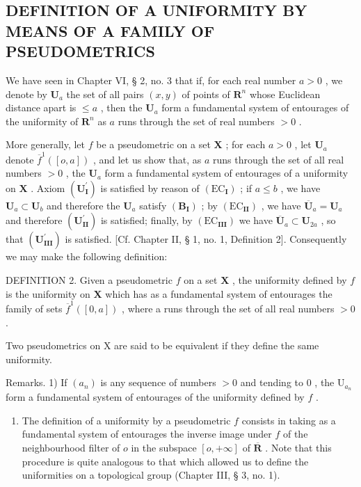 \subsection{DEFINITION OF A UNIFORMITY BY MEANS OF A FAMILY OF PSEUDOMETRICS}

We have seen in Chapter VI, § 2, no. 3 that if, for each real number \(a > 0\) , we denote by \(\mathbf{U}_a\) the set of all pairs \((x, y)\) of points of \(\mathbf{R}^n\) whose Euclidean distance apart is \(\leqslant a\) , then the \(\mathbf{U}_a\) form a fundamental system of entourages of the uniformity of \(\mathbf{R}^n\) as \(a\) runs through the set of real numbers \(> 0\) .

More generally, let \(f\) be a pseudometric on a set \(\mathbf{X}\) ; for each \(a > 0\) , let \(\mathbf{U}_a\) denote \(\overline{f}^{1}([o, a])\) , and let us show that, as \(a\) runs through the set of all real numbers \(> 0\) , the \(\mathbf{U}_a\) form a fundamental system of entourages of a uniformity on \(\mathbf{X}\) . Axiom \((\mathbf{U}_{\mathbf{I}}^{\prime})\) is satisfied by reason of \((\mathrm{EC}_{\mathbf{I}})\) ; if \(a \leqslant b\) , we have \(\mathbf{U}_a \subset \mathbf{U}_b\) and therefore the \(\mathbf{U}_a\) satisfy \((\mathbf{B}_{\mathbf{I}})\) ; by \((\mathrm{EC}_{\mathbf{II}})\) , we have \(\overline{\mathbf{U}}_a = \mathbf{U}_a\) and therefore \((\mathbf{U}_{\mathbf{II}}^{\prime})\) is satisfied; finally, by \((\mathrm{EC}_{\mathbf{III}})\) we have \(\overline{\mathbf{U}}_a \subset \mathbf{U}_{2a}\) , so that \((\mathbf{U}_{\mathbf{III}}^{\prime})\) is satisfied. {[}Cf. Chapter II, § 1, no. 1, Definition 2{]}. Consequently we may make the following definition:

DEFINITION 2. Given a pseudometric \(f\) on a set \(\mathbf{X}\) , the uniformity defined by \(f\) is the uniformity on \(\mathbf{X}\) which has as a fundamental system of entourages the family of sets \(\overline{f}^{1}([0, a])\) , where a runs through the set of all real numbers \(> 0\) .

Two pseudometrics on X are said to be equivalent if they define the same uniformity.

Remarks. 1) If \((a_{n})\) is any sequence of numbers \(>0\) and tending to \(0\) , the \(\mathrm{U}_{a_n}\) form a fundamental system of entourages of the uniformity defined by \(f\) .

\begin{enumerate}
\def\labelenumi{\arabic{enumi})}
\setcounter{enumi}{1}
\tightlist
\item
  The definition of a uniformity by a pseudometric \(f\) consists in taking as a fundamental system of entourages the inverse image under \(f\) of the neighbourhood filter of \(o\) in the subspace \([o, +\infty]\) of \(\overline{\mathbf{R}}\) . Note that this procedure is quite analogous to that which allowed us to define the uniformities on a topological group (Chapter III, § 3, no. 1).
\end{enumerate}

